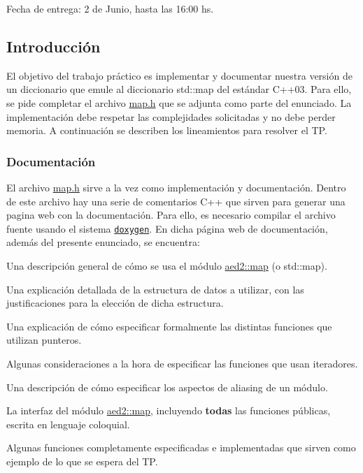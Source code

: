 
\begin{DoxyItemize}
\item Fecha de entrega\-: 2 de Junio, hasta las 16\-:00 hs.
\end{DoxyItemize}\hypertarget{Enunciado_intro-enunciado}{}\subsection{Introducción}\label{Enunciado_intro-enunciado}
El objetivo del trabajo práctico es implementar y documentar nuestra versión de un diccionario que emule al diccionario {\ttfamily std\-::map} del estándar C++03. Para ello, se pide completar el archivo {\ttfamily \hyperlink{map_8h}{map.\-h}} que se adjunta como parte del enunciado. La implementación debe respetar las complejidades solicitadas y no debe perder memoria. A continuación se describen los lineamientos para resolver el T\-P.\hypertarget{Enunciado_intro-doc}{}\subsubsection{Documentación}\label{Enunciado_intro-doc}
El archivo {\ttfamily \hyperlink{map_8h}{map.\-h}} sirve a la vez como implementación y documentación. Dentro de este archivo hay una serie de comentarios C++ que sirven para generar una pagina web con la documentación. Para ello, es necesario compilar el archivo fuente usando el sistema \href{http://www.doxygen.org}{\tt doxygen}. En dicha página web de documentación, además del presente enunciado, se encuentra\-:


\begin{DoxyItemize}
\item Una descripción general de cómo se usa el módulo {\ttfamily \hyperlink{classaed2_1_1map}{aed2\-::map}} (o {\ttfamily std\-::map}).
\item Una explicación detallada de la estructura de datos a utilizar, con las justificaciones para la elección de dicha estructura.
\item Una explicación de cómo especificar formalmente las distintas funciones que utilizan punteros.
\item Algunas consideraciones a la hora de especificar las funciones que usan iteradores.
\item Una descripción de cómo especificar los aspectos de aliasing de un módulo.
\item La interfaz del módulo {\ttfamily \hyperlink{classaed2_1_1map}{aed2\-::map}}, incluyendo {\bfseries todas} las funciones públicas, escrita en lenguaje coloquial.
\item Algunas funciones completamente especificadas e implementadas que sirven como ejemplo de lo que se espera del T\-P.
\end{DoxyItemize}


